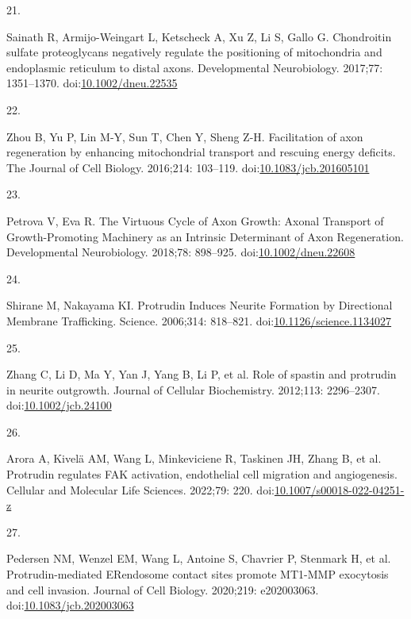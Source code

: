 \documentclass[
  12pt,
  a4paper,
]{book}
\newlength{\cslhangindent}
\newlength{\csllabelwidth}
\newlength{\cslentryspacingunit} %
\newenvironment{CSLReferences}[2] %
 {%
  \setlength{\parindent}{0pt}
  \ifodd #1
  \let\oldpar\par
  \def\par{\hangindent=\cslhangindent\oldpar}
  \fi
  \setlength{\parskip}{#2\cslentryspacingunit}
 }%
 {}
\newcommand{\CSLLeftMargin}[1]{\parbox[t]{\csllabelwidth}{#1}}
\newcommand{\CSLRightInline}[1]{\parbox[t]{\linewidth - \csllabelwidth}{#1}\break}
\begin{document}
\begin{CSLReferences}{0}{0}
\leavevmode{}%
\CSLLeftMargin{21. }%
\CSLRightInline{Sainath R, Armijo-Weingart L, Ketscheck A, Xu Z, Li S, Gallo G. Chondroitin sulfate proteoglycans negatively regulate the positioning of mitochondria and endoplasmic reticulum to distal axons. Developmental Neurobiology. 2017;77: 1351--1370. doi:\href{https://doi.org/10.1002/dneu.22535}{10.1002/dneu.22535}}

\leavevmode{}%
\CSLLeftMargin{22. }%
\CSLRightInline{Zhou B, Yu P, Lin M-Y, Sun T, Chen Y, Sheng Z-H. Facilitation of axon regeneration by enhancing mitochondrial transport and rescuing energy deficits. The Journal of Cell Biology. 2016;214: 103--119. doi:\href{https://doi.org/10.1083/jcb.201605101}{10.1083/jcb.201605101}}

\leavevmode{}%
\CSLLeftMargin{23. }%
\CSLRightInline{Petrova V, Eva R. The {Virtuous Cycle} of {Axon Growth}: {Axonal Transport} of {Growth-Promoting Machinery} as an {Intrinsic Determinant} of {Axon Regeneration}. Developmental Neurobiology. 2018;78: 898--925. doi:\href{https://doi.org/10.1002/dneu.22608}{10.1002/dneu.22608}}

\leavevmode{}%
\CSLLeftMargin{24. }%
\CSLRightInline{Shirane M, Nakayama KI. Protrudin {Induces Neurite Formation} by {Directional Membrane Trafficking}. Science. 2006;314: 818--821. doi:\href{https://doi.org/10.1126/science.1134027}{10.1126/science.1134027}}

\leavevmode{}%
\CSLLeftMargin{25. }%
\CSLRightInline{Zhang C, Li D, Ma Y, Yan J, Yang B, Li P, et al. Role of spastin and protrudin in neurite outgrowth. Journal of Cellular Biochemistry. 2012;113: 2296--2307. doi:\href{https://doi.org/10.1002/jcb.24100}{10.1002/jcb.24100}}

\leavevmode{}%
\CSLLeftMargin{26. }%
\CSLRightInline{Arora A, Kivelä AM, Wang L, Minkeviciene R, Taskinen JH, Zhang B, et al. Protrudin regulates {FAK} activation, endothelial cell migration and angiogenesis. Cellular and Molecular Life Sciences. 2022;79: 220. doi:\href{https://doi.org/10.1007/s00018-022-04251-z}{10.1007/s00018-022-04251-z}}

\leavevmode{}%
\CSLLeftMargin{27. }%
\CSLRightInline{Pedersen NM, Wenzel EM, Wang L, Antoine S, Chavrier P, Stenmark H, et al. Protrudin-mediated {ER}\textendash endosome contact sites promote {MT1-MMP} exocytosis and cell invasion. Journal of Cell Biology. 2020;219: e202003063. doi:\href{https://doi.org/10.1083/jcb.202003063}{10.1083/jcb.202003063}}


\end{CSLReferences}
\end{document}
